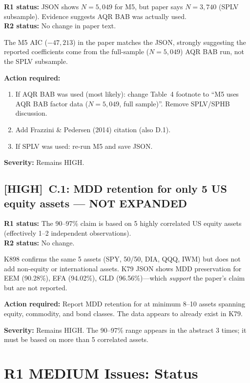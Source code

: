\documentclass[12pt,a4paper]{article}
\newcommand{\HIGH}{\textcolor{highsev}{\textbf{[HIGH]}}}
\begin{document}
\textbf{R1 status:} JSON shows $N = 5{,}049$ for M5, but paper says $N = 3{,}740$ (SPLV subsample). Evidence suggests AQR BAB was actually used.\\
\textbf{R2 status:} \textcolor{highsev}{No change in paper text.}

The M5 AIC ($-47{,}213$) in the paper matches the JSON, strongly suggesting the reported coefficients come from the full-sample ($N = 5{,}049$) AQR BAB run, not the SPLV subsample.

\textbf{Action required:}
\begin{enumerate}[nosep]
\item If AQR BAB was used (most likely): change Table~4 footnote to ``M5 uses AQR BAB factor data ($N = 5{,}049$, full sample)''. Remove SPLV/SPHB discussion.
\item Add Frazzini \& Pedersen (2014) citation (also D.1).
\item If SPLV was used: re-run M5 and save JSON.
\end{enumerate}

\textbf{Severity:} \textcolor{highsev}{Remains HIGH.}

\bigskip


\subsection{\HIGH\ C.1: MDD retention for only 5 US equity assets --- NOT EXPANDED}

\textbf{R1 status:} The 90--97\% claim is based on 5 highly correlated US equity assets (effectively 1--2 independent observations).\\
\textbf{R2 status:} \textcolor{highsev}{No change.}

K898 confirms the same 5 assets (SPY, 50/50, DIA, QQQ, IWM) but does not add non-equity or international assets. K79 JSON shows MDD preservation for EEM (90.28\%), EFA (94.02\%), GLD (96.56\%)---which \textit{support} the paper's claim but are not reported.

\textbf{Action required:} Report MDD retention for at minimum 8--10 assets spanning equity, commodity, and bond classes. The data appears to already exist in K79.

\textbf{Severity:} \textcolor{highsev}{Remains HIGH.} The 90--97\% range appears in the abstract 3 times; it must be based on more than 5 correlated assets.


\section{R1 MEDIUM Issues: Status}
\label{sec:medium}
\end{document}
